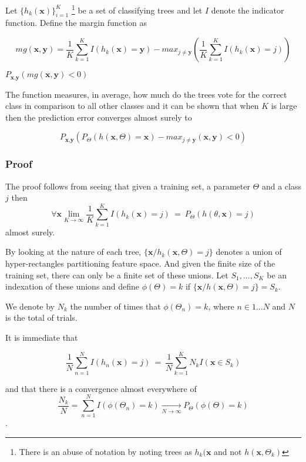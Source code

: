 Let $\{h_k(\textbf{x})\}_{i=1}^K$  \footnote{There is an abuse of notation by noting trees as $h_k(\textbf{x}$ and not $h(\textbf{x}, \Theta_k)$ } be a set of classifying trees and let $I$ denote the indicator function.  Define the margin function as

$$mg(\textbf{x},\textbf{y}) =  \frac{1}{K}   \sum_{k=1}^K I(h_k(\textbf{x}) = \textbf{y})  
- max_{j\neq \textbf{y}}\left(\frac{1}{K} \sum_{k=1}^K I(h_k(\textbf{x}) = j) \right) $$ \label{eq:rf-marginFun}

$ P_{\textbf{x}, \textbf{y} }(mg(\textbf{x}, \textbf{y}) < 0) $


The function measures, in average, how much do the trees vote for the correct class in comparison to all other classes and it can be shown that when $K$ is large then the prediction error converges almost surely to 

$$ P_{\textbf{x}, \textbf{y} } ( P_{\Theta} (h(\textbf{x}, \Theta) = \textbf{x}) - max_{j \neq \textbf{y}} (\textbf{x}, \textbf{y}) < 0) $$

\subsubsection{Proof}
The proof follows from seeing that given a training set, a parameter $\Theta$ and a class $j$ then 
$$\forall \textbf{x} \lim_{K\to\infty} \frac{1}{K} \sum_{k=1}^K I(h_k(\textbf{x}) = j) \ =   \ P_\Theta(h(\theta,\textbf{x}) = j) $$
 almost surely.

By looking at the nature of each tree, $\{\textbf{x} / h_k(\textbf{x}, \Theta) = j \}$ denotes a union of hyper-rectangles partitioning feature space. And given the finite size of the training set, there can only be a finite set of these unions. Let $S_1, ..., S_K$ be an indexation of these unions and define $\phi(\Theta) = k $ if $\{\textbf{x} / h(\textbf{x}, \Theta) = j \} = S_k$. 

We denote by $N_k$ the number of times that $\phi(\Theta_n) =k $, where $n \in {1...N}$ and $N$ is the total of trials.

It is immediate that 

$$ \frac{1}{N} \sum_{n=1}^N I(h_n(\textbf{x}) = j) \ = \  \frac{1}{N} \sum_{k=1}^K N_k I(\textbf{x} \in S_k)  $$

and that there is a convergence almost everywhere of $$ \frac{N_k}{N} = \sum_{n=1}^N  I(\phi(\Theta_n) = k)  \xrightarrow[N \to \infty]{}   P_{\Theta}(\phi(\Theta)= k)$$. 

